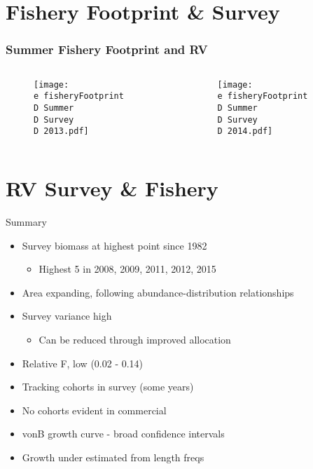 \documentclass{beamer}
\begin{document}
\section{Fishery Footprint \& Survey}
\begin{frame}
\frametitle{Summer Fishery Footprint and RV}
\begin{columns}
	\begin{column}{.48\textwidth}
		\begin{figure}
		\centerline{\texttt{[image: \\e fisheryFootprint\\D Summer\\D Survey\\D 2013.pdf]}}
		\end{figure}
	\end{column}

	\begin{column}{0.48\textwidth}
	\begin{figure}

 		\centerline{\texttt{[image: \\e fisheryFootprint\\D Summer\\D Survey\\D 2014.pdf]}}

 \end{figure}
	 \end{column}
 \end{columns}
 \end{frame}



\section{RV Survey \& Fishery}
\begin{frame}
\begin{block}{Summary}
\begin{itemize}
	\item Survey biomass at highest point since 1982
	\begin{itemize}
		\item Highest 5 in 2008, 2009, 2011, 2012, 2015
	\end{itemize}
	\item Area expanding, following abundance-distribution relationships
	\item Survey variance high
	\begin{itemize}
		\item Can be reduced through improved allocation
	\end{itemize}
	\item Relative F, low (0.02 - 0.14)
	\item Tracking cohorts in survey (some years)
	\item No cohorts evident in commercial
	\item vonB growth curve - broad confidence intervals
	\item Growth under estimated from length freqs 
\end{itemize}
\end{block}
\end{frame}
\end{document}
